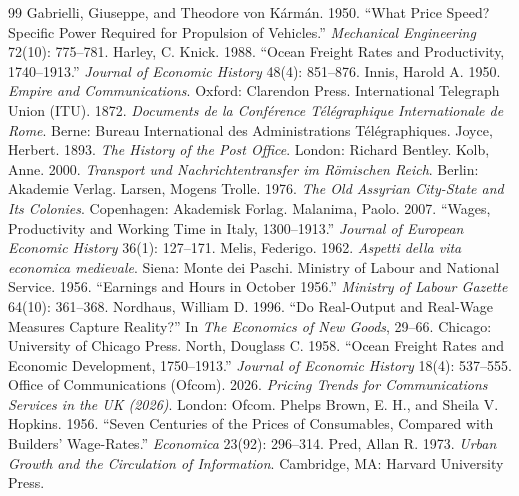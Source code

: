 \documentclass[11pt,a4paper]{article}
\begin{document}
\begin{thebibliography}{99}
 Gabrielli, Giuseppe, and Theodore von K\'arm\'an. 1950. ``What Price Speed? Specific Power Required for Propulsion of Vehicles.'' \textit{Mechanical Engineering} 72(10): 775--781.
 Harley, C. Knick. 1988. ``Ocean Freight Rates and Productivity, 1740--1913.'' \textit{Journal of Economic History} 48(4): 851--876.
 Innis, Harold A. 1950. \textit{Empire and Communications}. Oxford: Clarendon Press.
 International Telegraph Union (ITU). 1872. \textit{Documents de la Conf\'erence T\'el\'egraphique Internationale de Rome}. Berne: Bureau International des Administrations T\'el\'egraphiques.
 Joyce, Herbert. 1893. \textit{The History of the Post Office}. London: Richard Bentley.
 Kolb, Anne. 2000. \textit{Transport und Nachrichtentransfer im R\"omischen Reich}. Berlin: Akademie Verlag.
 Larsen, Mogens Trolle. 1976. \textit{The Old Assyrian City-State and Its Colonies}. Copenhagen: Akademisk Forlag.
 Malanima, Paolo. 2007. ``Wages, Productivity and Working Time in Italy, 1300--1913.'' \textit{Journal of European Economic History} 36(1): 127--171.
 Melis, Federigo. 1962. \textit{Aspetti della vita economica medievale}. Siena: Monte dei Paschi.
 Ministry of Labour and National Service. 1956. ``Earnings and Hours in October 1956.'' \textit{Ministry of Labour Gazette} 64(10): 361--368.
 Nordhaus, William D. 1996. ``Do Real-Output and Real-Wage Measures Capture Reality?'' In \textit{The Economics of New Goods}, 29--66. Chicago: University of Chicago Press.
 North, Douglass C. 1958. ``Ocean Freight Rates and Economic Development, 1750--1913.'' \textit{Journal of Economic History} 18(4): 537--555.
 Office of Communications (Ofcom). 2026. \textit{Pricing Trends for Communications Services in the UK (2026)}. London: Ofcom.
 Phelps Brown, E. H., and Sheila V. Hopkins. 1956. ``Seven Centuries of the Prices of Consumables, Compared with Builders' Wage-Rates.'' \textit{Economica} 23(92): 296--314.
 Pred, Allan R. 1973. \textit{Urban Growth and the Circulation of Information}. Cambridge, MA: Harvard University Press.

\end{thebibliography}
\end{document}
